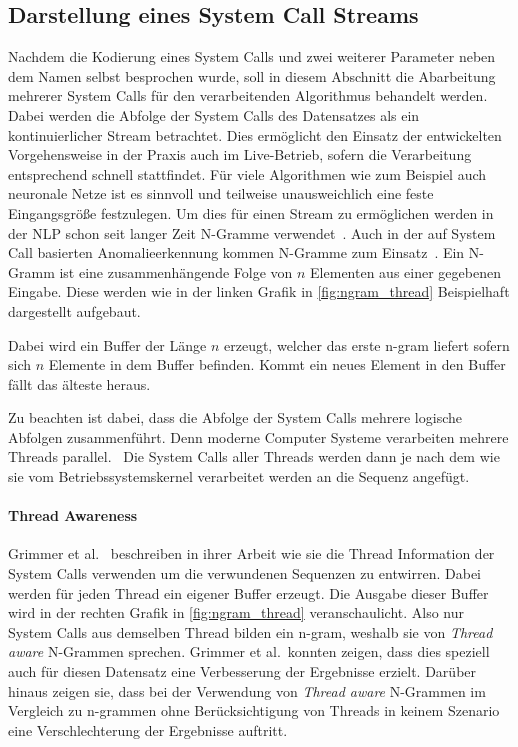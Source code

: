         \subsection{Darstellung eines System Call Streams}\label{sec:streamdarstellung}
            Nachdem die Kodierung eines System Calls und zwei weiterer Parameter neben dem Namen selbst besprochen wurde, soll in diesem Abschnitt die Abarbeitung mehrerer System Calls für den verarbeitenden Algorithmus behandelt werden.
            Dabei werden die Abfolge der System Calls des Datensatzes als ein kontinuierlicher Stream betrachtet.
            Dies ermöglicht den Einsatz der entwickelten Vorgehensweise in der Praxis auch im Live-Betrieb, sofern die Verarbeitung entsprechend schnell stattfindet.
            Für viele Algorithmen wie zum Beispiel auch neuronale Netze ist es sinnvoll und teilweise unausweichlich eine feste Eingangsgröße festzulegen.
            Um dies für einen Stream zu ermöglichen werden in der \ac{NLP} schon seit langer Zeit N-Gramme verwendet~\cite{NGRAMSUEN1979}.
            Auch in der auf System Call basierten Anomalieerkennung kommen N-Gramme zum Einsatz~\cite{STIDE_Alternatives, SYSCALL_GRAPHS, IDSTHREADGRIMMER2021}.
            Ein N-Gramm ist eine zusammenhängende Folge von $n$ Elementen aus einer gegebenen Eingabe.
            Diese werden wie in der linken Grafik in \autoref{fig:ngram_thread} Beispielhaft dargestellt aufgebaut.

            Dabei wird ein Buffer der Länge $n$ erzeugt, welcher das erste n-gram liefert sofern sich $n$ Elemente in dem Buffer befinden.
            Kommt ein neues Element in den Buffer fällt das älteste heraus.

            Zu beachten ist dabei, dass die Abfolge der System Calls mehrere logische Abfolgen zusammenführt.
            Denn moderne Computer Systeme verarbeiten mehrere Threads parallel.~\cite{SYSCALL_SILBERSCHATZ}
            Die System Calls aller Threads werden dann je nach dem wie sie vom Betriebssystemskernel verarbeitet werden an die Sequenz angefügt.
            
            \paragraph{Thread Awareness}
                Grimmer et al.~\cite{IDSTHREADGRIMMER2021} beschreiben in ihrer Arbeit wie sie die Thread Information der System Calls verwenden um die verwundenen Sequenzen zu entwirren.
                Dabei werden für jeden Thread ein eigener Buffer erzeugt. 
                Die Ausgabe dieser Buffer wird in der rechten Grafik in \autoref{fig:ngram_thread} veranschaulicht. 
            Also nur System Calls aus demselben Thread bilden ein n-gram, weshalb sie von \textit{Thread aware} N-Grammen sprechen.
                Grimmer et al.\ konnten zeigen, dass dies speziell auch für diesen Datensatz eine Verbesserung der Ergebnisse erzielt.
                Darüber hinaus zeigen sie, dass bei der Verwendung von \textit{Thread aware} N-Grammen im Vergleich zu n-grammen ohne Berücksichtigung von Threads in keinem Szenario eine Verschlechterung der Ergebnisse auftritt.

